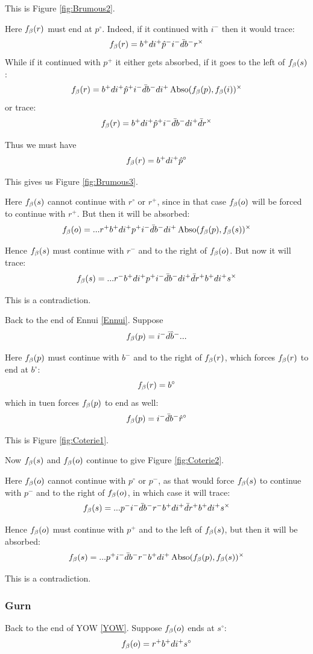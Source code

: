 This is Figure \ref{fig:Brumous2}.

Here $f_\beta(r)$ must end at $p^\circ$. Indeed, if it continued with $i^-$ then it would trace:
\[
f_\beta(r) = b^+ d i^+ \hat{p}^- i^- \bar{d} b^- r^\times
\]
While if it continued with $p^+$ it either gets absorbed, if it goes to the left of $f_\beta(s)$:
\[
f_\beta(r) = b^+ d i^+ \hat{p}^+ i^- \bar{d} b^- d i^+ \operatorname{Abso}(f_\beta(p), f_\beta(i))^\times
\]
or trace:
\[
f_\beta(r) = b^+ d i^+ \hat{p}^+ i^- \bar{d} b^- d i^+ \bar{d} r^\times
\]

Thus we must have 
\[
f_\beta(r) = b^+ d i^+ \hat{p}^\circ
\]

This gives us Figure \ref{fig:Brumous3}.

Here $f_\beta(s)$ cannot continue with $r^\circ$ or $r^+$, since in that case $f_\beta(o)$ will be forced to continue with $r^+$. But then it will be absorbed:
\[
f_\beta(o) = ... r^+ b^+ d i^+ p^+ i^- \bar{d} b^- d i^+ \operatorname{Abso}(f_\beta(p), f_\beta(s))^\times
\]

Hence $f_\beta(s)$ must continue with $r^-$ and to the right of $f_\beta(o)$. But now it will trace:
\[
f_\beta(s) = ...r^- b^+ d i^+ p^+ i^- \bar{d} b^- d i^+ \bar{d} r^+ b^+ d i^+ s^\times 
\]

This is a contradiction.

\label{Coterie}
Back to the end of Ennui \ref{Ennui}. Suppose 
\[
f_\beta(p) = i^- \bar{d} \hat{b}^-...
\]

Here $f_\beta(p)$ must continue with $b^-$ and to the right of $f_\beta(r)$, which forces $f_\beta(r)$ to end at $b^\circ$:
\[
f_\beta(r) = b^\circ
\]
which in tuen forces $f_\beta(p)$ to end as well:
\[
f_\beta(p) = i^- \bar{d} b^- \hat{r}^\circ
\]

This is Figure \ref{fig:Coterie1}.

Now $f_\beta(s)$ and $f_\beta(o)$ continue to give Figure \ref{fig:Coterie2}.

Here $f_\beta(o)$ cannot continue with $p^\circ$ or $p^-$, as that would force $f_\beta(s)$ to continue with $p^-$ and to the right of $f_\beta(o)$, in which case it will trace:
\[
f_\beta(s) = ...p^- i^- \bar{d} b^- r^- b^+ d i^+ \bar{d} r^+ b^+ d i^+ s^\times
\]

Hence $f_\beta(o)$ must continue with $p^+$ and to the left of $f_\beta(s)$, but then it will be absorbed:
\[
f_\beta(s) = ...p^+ i^- \bar{d} b^- r^- b^+ d i^+ \operatorname{Abso}(f_\beta(p), f_\beta(s))^\times
\]

This is a contradiction.

\subsubsection{Gurn}\label{Gurn}
Back to the end of YOW \ref{YOW}. Suppose $f_\beta(o)$ ends at $s^\circ$:
\[
f_\beta(o) = r^+ b^+ d i^+ s^\circ
\]

